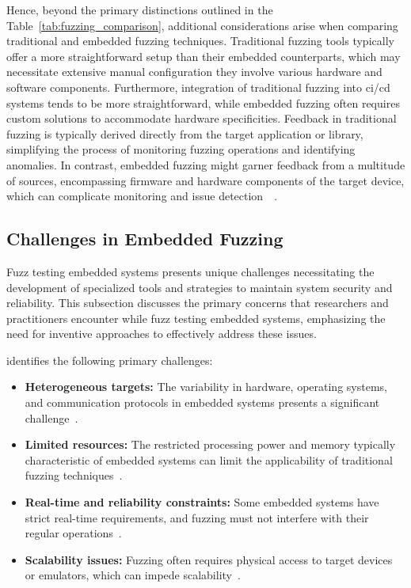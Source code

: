 Hence, beyond the primary distinctions outlined in the Table~\ref{tab:fuzzing_comparison},
additional considerations arise when comparing traditional and embedded fuzzing techniques.
Traditional fuzzing tools typically offer a more straightforward setup than their embedded counterparts,
which may necessitate extensive manual configuration they involve various
hardware and software components. Furthermore, integration of traditional
fuzzing into \acrlong{ci/cd} systems tends to be more straightforward,
while embedded fuzzing often requires custom solutions to accommodate
hardware specificities. Feedback in traditional fuzzing is typically
derived directly from the target application or library,
simplifying the process of monitoring fuzzing operations and
identifying anomalies. In contrast, embedded fuzzing might garner feedback
from a multitude of sources, encompassing firmware and hardware components
of the target device, which can complicate monitoring and issue detection~\cite{yun2022fuzzing}~\cite{WhatAreE30:online}.

\subsection{Challenges in Embedded Fuzzing}
Fuzz testing embedded systems presents unique challenges necessitating the
development of specialized tools and strategies to maintain system security and
reliability. This subsection discusses the primary concerns that researchers and
practitioners encounter while fuzz testing embedded systems, emphasizing the need for
inventive approaches to effectively address these issues.

 identifies the following primary challenges:
\begin{itemize}
\item \textbf{Heterogeneous targets:} The variability in hardware, operating systems, and communication protocols in embedded systems presents a significant challenge~\cite{yun2022fuzzing}.
\item \textbf{Limited resources:} The restricted processing power and memory typically characteristic of embedded systems can limit the applicability of traditional fuzzing techniques~\cite{yun2022fuzzing}.
\item \textbf{Real-time and reliability constraints:} Some embedded systems have strict real-time requirements, and fuzzing must not interfere with their regular operations~\cite{yun2022fuzzing}.
\item \textbf{Scalability issues:} Fuzzing often requires physical access to target devices or emulators, which can impede scalability~\cite{yun2022fuzzing}.
\end{itemize}

